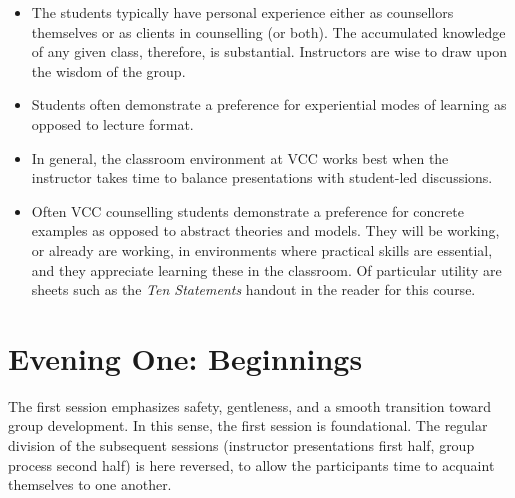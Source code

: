 \documentclass[12pt,DIV7,oneside,tocindent,headsepline]{scrbook}
\begin{document}
\begin{itemize}
\item The students typically have personal experience either as counsellors themselves or as clients in counselling (or both). The accumulated knowledge of any given class, therefore, is substantial. Instructors are wise to draw upon the wisdom of the group.

\item Students often demonstrate a preference for experiential modes of learning as opposed to lecture format.

\item In general, the classroom environment at VCC works best when the instructor takes time to balance presentations with student-led discussions.

\item Often VCC counselling students demonstrate a preference for concrete examples as opposed to abstract theories and models. They will be working, or already are working, in environments where practical skills are essential, and they appreciate learning these in the classroom. Of particular utility are sheets such as the \textit{Ten Statements} handout in the reader for this course.

\end{itemize}

 

\section{Evening One: Beginnings}  
The first session emphasizes safety, gentleness, and a smooth transition toward group development. In this sense, the first session is foundational. The regular division of the subsequent sessions (instructor presentations first half, group process second half) is here reversed, to allow the participants time to acquaint themselves to one another.  
\end{document}
